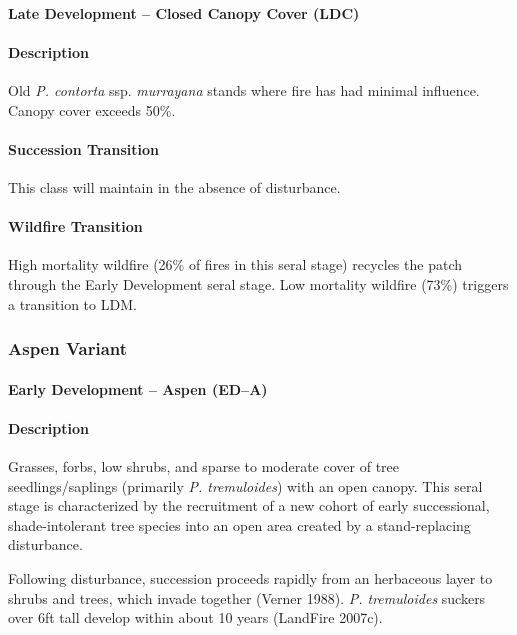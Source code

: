 \noindent\hrulefill

\paragraph{Late Development – Closed Canopy Cover (LDC)}

\paragraph{Description} Old \emph{P. contorta} ssp. \emph{murrayana} stands where fire has had minimal influence. Canopy cover exceeds 50\%.

\paragraph{Succession Transition} This class will maintain in the absence of disturbance.

\paragraph{Wildfire Transition} High mortality wildfire (26\% of fires in this seral stage) recycles the patch through the Early Development seral stage. Low mortality wildfire (73\%) triggers a transition to LDM.

\noindent\hrulefill
\noindent\hrulefill

\subsubsection{Aspen Variant}

\paragraph{Early Development – Aspen (ED–A)}

\paragraph{Description} Grasses, forbs, low shrubs, and sparse to moderate cover of tree seedlings/saplings (primarily \emph{P. tremuloides}) with an open canopy. This seral stage is characterized by the recruitment of a new cohort of early successional, shade-intolerant tree species into an open area created by a stand-replacing disturbance. 

Following disturbance, succession proceeds rapidly from an herbaceous layer to shrubs and trees, which invade together (Verner 1988). \emph{P. tremuloides} suckers over 6ft tall develop within about 10 years (LandFire 2007c). 


